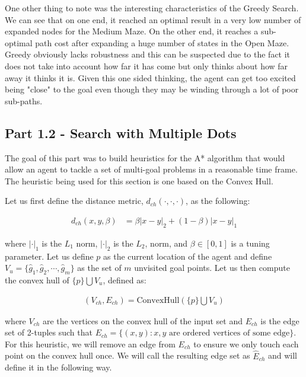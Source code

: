 \documentclass{article}[12pt]
\begin{document}
   One other thing to note was the interesting characteristics of the Greedy Search. We can see that on one end, it reached an optimal result in a very low number of expanded nodes for the Medium Maze. On the other end, it reaches a sub-optimal path cost after expanding a huge number of states in the Open Maze. Greedy obviously lacks robustness and this can be suspected due to the fact it does not take into account how far it has come but only thinks about how far away it thinks it is. Given this one sided thinking, the agent can get too excited being "close" to the goal even though they may be winding through a lot of poor sub-paths.
   
    
   
    \newpage
   \subsection{Part 1.2 - Search with Multiple Dots}
The goal of this part was to build heuristics for the A* algorithm that would allow an agent to tackle a set of multi-goal problems in a reasonable time frame. The heuristic being used for this section is one based on the Convex Hull. 

Let us first define the distance metric, $d_{ch}(\cdot,\cdot,\cdot)$, as the following:

\begin{align*}
d_{ch}(x,y, \beta) &= \beta |x-y|_2+ \left(1-\beta\right) |x-y|_1 
\end{align*}

where $|\cdot|_1$ is the $L_1$ norm, $|\cdot|_2$ is the $L_2$, norm, and $\beta \in [0,1]$ is a tuning parameter. Let us define $p$ as the current location of the agent and define $V_u = \lbrace \hat{g}_1, \hat{g}_2, \cdots, \hat{g}_m \rbrace$ as the set of $m$ unvisited goal points. Let us then compute the convex hull of $\lbrace p \rbrace \bigcup V_u$, defined as:

\begin{align*}
\left(V_{ch}, E_{ch} \right) = \text{ConvexHull}\left(\lbrace p \rbrace \bigcup V_u \right)
\end{align*}

where $V_{ch}$ are the vertices on the convex hull of the input set and $E_{ch}$ is the edge set of 2-tuples such that $E_{ch} = \lbrace (x,y): x,y \text{ are ordered vertices of some edge} \rbrace$. For this heuristic, we will remove an edge from $E_{ch}$ to ensure we only touch each point on the convex hull once. We will call the resulting edge set as $\hat{E}_{ch}$ and will define it in the following way. 
\end{document}
